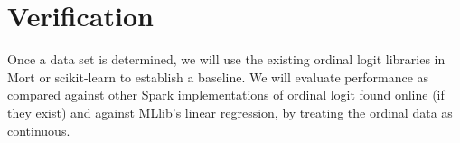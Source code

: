 \documentclass{article}
\begin{document}
	\section{Verification}
	Once a data set is determined, we will use the existing ordinal logit libraries in Mort or scikit-learn to establish a baseline. We will evaluate performance as compared against other Spark implementations of ordinal logit found online (if they exist) and against MLlib's linear regression, by treating the ordinal data as continuous.
\end{document}
